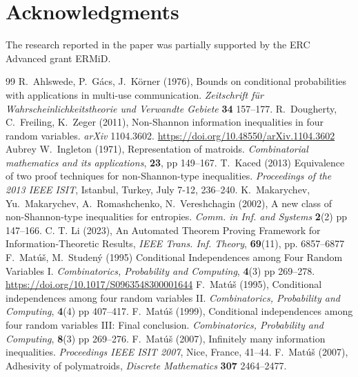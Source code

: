 \documentclass[a4paper]{IEEEtran}
\theoremstyle{definition}
\begin{document}
\section*{Acknowledgments}
The research reported in the paper was partially supported by the ERC
Advanced grant ERMiD.


\begin{thebibliography}{99}
   R.~Ahlswede, P.~G\'acs, J.~K\"orner (1976),
  Bounds on conditional probabilities with applications in multi-use
  communication.
  \emph{Zeitschrift f\"ur Wahrscheinlichkeitstheorie und Verwandte Gebiete}
   {\bf 34} 157--177.
%
  R.~Dougherty, C.~Freiling, K.~Zeger (2011),
  {Non-Shannon information inequalities in four random variables}.
  \emph{arXiv} 1104.3602.
  \url{https://doi.org/10.48550/arXiv.1104.3602}
%
 Aubrey W.~Ingleton (1971), 
 Representation of matroids.
\emph{Combinatorial mathematics and its applications}, {\bf23}, pp 149--167.
%
 T.~Kaced (2013)
  Equivalence of two proof techniques for non-Shannon-type inequalities.
  \emph{Proceedings of the 2013 {IEEE} ISIT}, Istanbul, Turkey, July 7-12, 236--240.
%
 K.~Makarychev, Yu.~Makarychev, A.~Romashchenko,
  N.~Vereshchagin (2002),
  A new class of non-Shannon-type inequalities for entropies.
  \emph{Comm. in Inf. and Systems} {\bf 2}(2) pp 147--166.
%
  C. T. Li (2023),
  An Automated Theorem Proving Framework for Infor\-ma\-tion{-}Theoretic Results,
  \emph{IEEE Trans. Inf. Theory}, {\bf69}(11), pp. 6857--6877
%
  F.~Mat\'u\v{s}, M.~Studen\'y (1995)
  Conditional Independences among Four Random Variables I.
  \emph{Combinatorics, Probability and Computing}, {\bf 4}(3) pp 269--278.
  \url{https://doi.org/10.1017/S0963548300001644}
%
   F.~Mat\'{u}\v{s} (1995),
   Conditional independences among four random variables II.
  \emph{Combinatorics, Probability and Computing},
  {\bf4}(4) pp 407--417.
%
  F.~Mat\'{u}\v{s} (1999),
  Conditional independences among four random variables III:
  Final conclusion.
  \emph{Combinatorics, Probability and Computing}, {\bf8}(3) pp 269--276.
%
   F.~Mat\'{u}\v{s} (2007),
   Infinitely many information inequalities.
   \emph{Proceedings IEEE ISIT 2007}, Nice, France, 41--44.
%
  F.~Mat\'u\v{s} (2007),
  Adhesivity of polymatroids,
  \emph{Discrete Mathematics} {\bf 307} 2464--2477.
%

\end{thebibliography}
\end{document}
